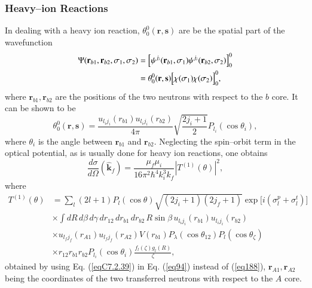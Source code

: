 \subsubsection{Heavy--ion Reactions}
 In  dealing with a heavy ion reaction, $\theta_0^0(\mathbf{r},\mathbf{s})$ are be the spatial part of the wavefunction
 \begin{equation}\label{eq189}
 \begin{split}
\Psi(\mathbf{r}_{b1},\mathbf{r}_{b2},\sigma_1,\sigma_2)&=\left[\psi ^{j_i} (\mathbf{r}_{b1},\sigma_1) \psi ^{j_i} (\mathbf{r}_{b2},\sigma_2) \right] _0^{0}\\
&=\theta_0^0(\mathbf{r},\mathbf{s})\Bigl[\chi(\sigma_1)\chi(\sigma_2)\Bigr]^{0}_{0},
 \end{split}
\end{equation}
where $\mathbf{r}_{b1},\mathbf{r}_{b2}$ are the positions of the two neutrons with respect to the $b$ core. It can be shown to be
 \begin{equation}\label{eqC7.2.39}
\theta_0^0(\mathbf{r},\mathbf{s})=\frac{u_{l_i j_i}(r_{b1})u_{l_i j_i}(r_{b2})}{4\pi}\sqrt{\frac{2j_i+1}{2}}P_{l_i}(\cos{\theta_i}),
\end{equation}
where $\theta_i$ is the angle between $\mathbf{r}_{b1}$ and $\mathbf{r}_{b2}$. Neglecting the spin--orbit term in the optical potential, as is usually done for heavy ion reactions, one obtains
\begin{equation}\label{eq191}
\frac{d\sigma}{d\Omega}(\hat{\mathbf{k}}_f)=\frac{\mu_f\mu_i}{16\pi^2\hbar^4k_i^3k_f}| T^{(1)}(\theta)|^2,
\end{equation}
where
\begin{equation}\label{eq192}
  \begin{split}
  T^{(1)}(\theta)&=\sum_{l}(2l+1)P_l(\cos\theta)
  \sqrt{(2j_i+1)(2j_f+1)}\exp\bigl[i(\sigma_{l}^p+\sigma_{l}^t)\bigr]\\
  &\times  \int dR \, d\beta\, d\gamma \, dr_{12}\,dr_{b1}\,dr_{b2}\,R\sin\beta\,u_{l_i j_i}(r_{b1})u_{l_i j_i}(r_{b2})   \\
  &\times u_{l_f j_f}(r_{A1})u_{l_f j_f}(r_{A2})V(r_{b1})
  P_\lambda(\cos \theta_{12})P_l(\cos \theta_\zeta)\\
  &\times r_{12}r_{b1}r_{b2} P_{l_i}(\cos{\theta_i})\frac{f_{l}(\zeta)g_{l}(R)}{\zeta},
  \end{split}
\end{equation}
obtained by using Eq. (\ref{eqC7.2.39}) in Eq. (\ref{eq94}) instead of (\ref{eq188}),  $\mathbf{r}_{A1},\mathbf{r}_{A2}$ being the coordinates of the two transferred  neutrons with respect to the $A$ core.


